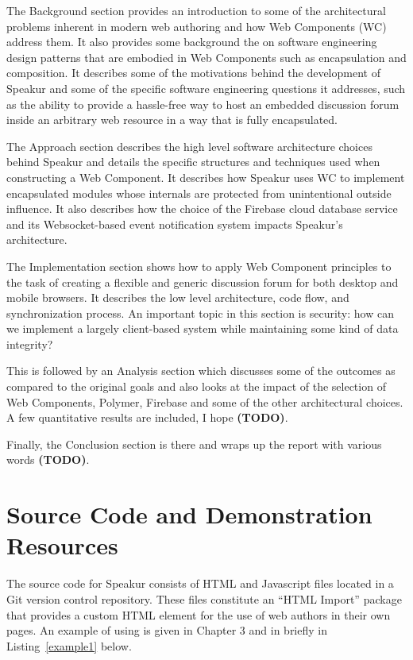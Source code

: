 The Background section provides an introduction to some of the architectural problems inherent in modern web authoring and how Web Components (WC) address them. 
It also provides some background the on software engineering design patterns that are embodied in Web Components such as encapsulation and composition.
It describes some of the motivations behind the development of Speakur and some of the specific software engineering questions it addresses, such as the ability to provide a hassle-free way to host an embedded discussion forum inside an arbitrary web resource in a way that is fully encapsulated.

The Approach section describes the high level software architecture choices behind Speakur and details the specific structures and techniques used when constructing a Web Component.
It describes how Speakur uses WC to implement encapsulated modules whose internals are protected from unintentional outside influence. 
It also describes how the choice of the Firebase cloud database service and its Websocket-based event notification system impacts Speakur's architecture.

The Implementation section shows how to apply Web Component principles to the task of creating a flexible and generic discussion forum for both desktop and mobile browsers. 
It describes the low level architecture, code flow, and synchronization process.
An important topic in this section is security: how can we implement a largely client-based system while maintaining some kind of data integrity?

This is followed by an Analysis section which discusses some of the outcomes as compared to the original goals and also looks at the impact of the selection of Web Components, Polymer, Firebase and some of the other architectural choices. 
A few quantitative results are included, I hope \textbf{(TODO)}.

Finally, the Conclusion section is there and wraps up the report with various words \textbf{(TODO)}. 

\section{Source Code and Demonstration Resources}
%

The source code for Speakur consists of HTML and Javascript files located in a Git version control repository. 
These files constitute an ``HTML Import'' package that provides a
\textbf{}
custom HTML element for the use of web authors in their own pages.
An example of using  is given in Chapter 3 and in briefly in Listing~\ref{example1} below.

